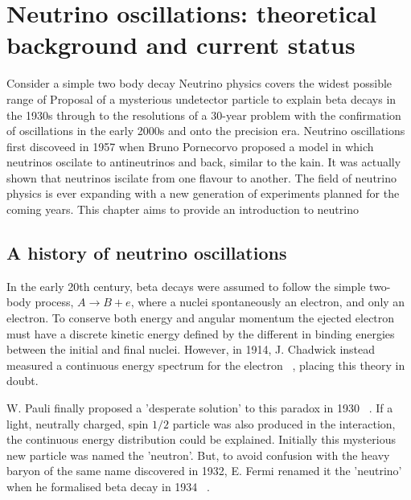 \chapter{Neutrino oscillations: theoretical background and current status}
\label{chap:theory}

Consider a simple two body decay 
Neutrino physics covers the widest possible range of 
Proposal of a mysterious undetector particle to explain beta decays in the 1930s through to the resolutions of a 30-year problem with the confirmation of oscillations in the early 2000s and onto the precision era.
Neutrino oscillations first discoveed in 1957 when Bruno Pornecorvo proposed a model in which neutrinos oscilate to antineutrinos and back, similar to the kain. It was actually shown that neutrinos iscilate from one flavour to another.
The field of neutrino physics is ever expanding with a new generation of experiments planned for the coming years. 
This chapter aims to provide an introduction to neutrino 

\section{A history of neutrino oscillations}
\label{sec:theoryhistory}

\begin{comment}
    TODO: Maybe add a few diagrams of the key plots throughout history
\end{comment}

In the early 20th century, beta decays were assumed to follow the simple two-body process, $A \rightarrow B + e$, where a
nuclei spontaneously an electron, and only an electron. To conserve both energy and angular momentum the ejected electron
must have a discrete kinetic energy defined by the different in binding energies between the initial and final nuclei.
However, in 1914, J. Chadwick instead measured a continuous energy spectrum for the electron ~\cite{chadwick1914},
placing this theory in doubt.

W. Pauli finally proposed a 'desperate solution' to this paradox in 1930 ~\cite{pauli1930}. If a light, neutrally charged,
spin $1/2$ particle was also produced in the interaction, the continuous energy distribution could be explained. Initially
this mysterious new particle was named the 'neutron'. But, to avoid confusion with the heavy baryon of the same name discovered
in 1932, E. Fermi renamed it the 'neutrino' when he formalised beta decay in 1934 ~\cite{fermi1934}.

